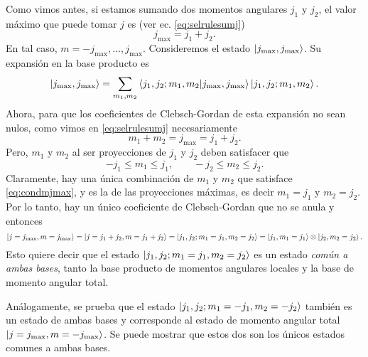\documentclass[10pt, a4paper]{article}
\newcommand{\jmax}{j_{\text{max}}}
\numberwithin{equation}{subsection}
\begin{document}
Como vimos antes, si estamos sumando dos momentos angulares $j_1$ y $j_2$, el
valor máximo que puede tomar $j$ es (ver ec. \eqref{eq:selrulesumj})
\begin{equation}
  \jmax = j_1 + j_2.
\end{equation}
En tal caso, $m = -\jmax, \ldots, \jmax$. Consideremos el
estado $\ket{\jmax, \jmax}$. Su expansión en la base producto
es
\begin{equation}
  \ket{\jmax, \jmax} =
  \sum_{m_1,m_2}\ClebschGordan{j_1}{j_2}{m_1}{m_2}{\jmax}{\jmax}
  \ket{j_1,j_2;m_1,m_2}.
\end{equation}
Ahora, para que los coeficientes de Clebsch-Gordan de esta expansión no sean
nulos, como vimos en \eqref{eq:selrulesumj} necesariamente
\begin{equation} \label{eq:condmjmax}
  m_1 + m_2 = \jmax = j_1 + j_2.
\end{equation}
Pero, $m_1$ y $m_2$ al ser proyecciones de $j_1$ y $j_2$ deben satisfacer que
\begin{equation}
  -j_1 \leq m_1 \leq j_1, \qquad -j_2 \leq m_2 \leq j_2.
\end{equation}
Claramente, hay una única combinación de $m_1$ y $m_2$ que satisface
\eqref{eq:condmjmax}, y es la de las proyecciones máximas, es decir $m_1 =
j_1$ y $m_2 = j_2$. Por lo tanto, hay un único coeficiente de Clebsch-Gordan
que no se anula y entonces
\begin{equation}
  \ket{j = \jmax, m = \jmax} =
  \ket{j = j_1 + j_2, m = j_1 + j_2} =
  \ket{j_1,j_2;m_1 = j_1,m_2 = j_2} =
  \ket{j_1,m_1=j_1}\tensor\ket{j_2,m_2=j_2}.
\end{equation}
Esto quiere decir que el estado $\ket{j_1,j_2;m_1 = j_1,m_2 = j_2}$ es un
estado \emph{común a ambas bases}, tanto la base producto de momentos angulares
locales y la base de momento angular total.

Análogamente, se prueba que el estado $\ket{j_1,j_2;m_1 = -j_1, m_2 = -j_2}$
también es un estado de ambas bases y corresponde al estado de momento angular
total $\ket{j = \jmax, m = -\jmax}$. Se puede mostrar que
estos dos son los únicos estados comunes a ambas bases.
\end{document}
